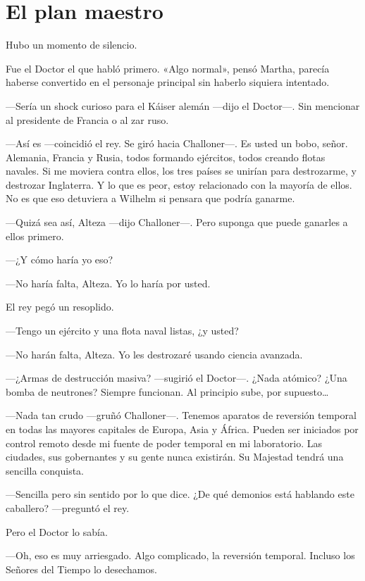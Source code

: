 \chapter*{El plan maestro}

Hubo un momento de silencio.

Fue el Doctor el que habló primero. «Algo normal», pensó Martha, parecía
haberse convertido en el personaje principal sin haberlo siquiera
intentado.

---Sería un shock curioso para el Káiser alemán ---dijo el Doctor---.
Sin mencionar al presidente de Francia o al zar ruso.

---Así es ---coincidió el rey. Se giró hacia Challoner---. Es usted un
bobo, señor. Alemania, Francia y Rusia, todos formando ejércitos, todos
creando flotas navales. Si me moviera contra ellos, los tres países se
unirían para destrozarme, y destrozar Inglaterra. Y lo que es peor,
estoy relacionado con la mayoría de ellos. No es que eso detuviera a
Wilhelm si pensara que podría ganarme.

---Quizá sea así, Alteza ---dijo Challoner---. Pero suponga que puede
ganarles a ellos primero.

---¿Y cómo haría yo eso?

---No haría falta, Alteza. Yo lo haría por usted.

El rey pegó un resoplido.

---Tengo un ejército y una flota naval listas, ¿y usted?

---No harán falta, Alteza. Yo les destrozaré usando ciencia avanzada.

---¿Armas de destrucción masiva? ---sugirió el Doctor---. ¿Nada
atómico? ¿Una bomba de neutrones? Siempre funcionan. Al principio
sube, por supuesto\ldots{}

---Nada tan crudo ---gruñó Challoner---. Tenemos aparatos de reversión
temporal en todas las mayores capitales de Europa, Asia y África. Pueden
ser iniciados por control remoto desde mi fuente de poder temporal en mi
laboratorio. Las ciudades, sus gobernantes y su gente nunca existirán.
Su Majestad tendrá una sencilla conquista.

---Sencilla pero sin sentido por lo que dice. ¿De qué demonios está
hablando este caballero? ---preguntó el rey.

Pero el Doctor lo sabía.

---Oh, eso es muy arriesgado. Algo complicado, la reversión temporal.
Incluso los Señores del Tiempo lo desechamos.

